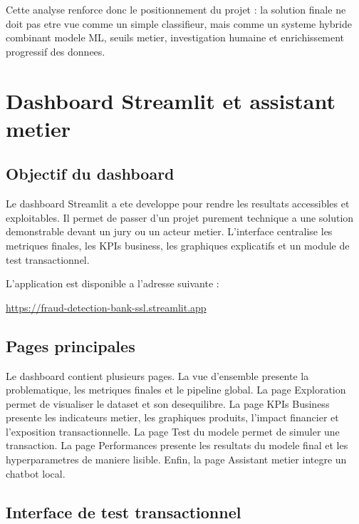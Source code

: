 ﻿\documentclass[12pt,a4paper,oneside]{report}
\begin{document}
Cette analyse renforce donc le positionnement du projet : la solution finale ne doit pas etre vue comme un simple classifieur, mais comme un systeme hybride combinant modele ML, seuils metier, investigation humaine et enrichissement progressif des donnees.

\chapter{Dashboard Streamlit et assistant metier}

\section{Objectif du dashboard}

Le dashboard Streamlit a ete developpe pour rendre les resultats accessibles et exploitables. Il permet de passer d'un projet purement technique a une solution demonstrable devant un jury ou un acteur metier. L'interface centralise les metriques finales, les KPIs business, les graphiques explicatifs et un module de test transactionnel.

L'application est disponible a l'adresse suivante :

\begin{center}
\url{https://fraud-detection-bank-ssl.streamlit.app}
\end{center}

\section{Pages principales}

Le dashboard contient plusieurs pages. La vue d'ensemble presente la problematique, les metriques finales et le pipeline global. La page Exploration permet de visualiser le dataset et son desequilibre. La page KPIs Business presente les indicateurs metier, les graphiques produits, l'impact financier et l'exposition transactionnelle. La page Test du modele permet de simuler une transaction. La page Performances presente les resultats du modele final et les hyperparametres de maniere lisible. Enfin, la page Assistant metier integre un chatbot local.

\section{Interface de test transactionnel}
\end{document}
